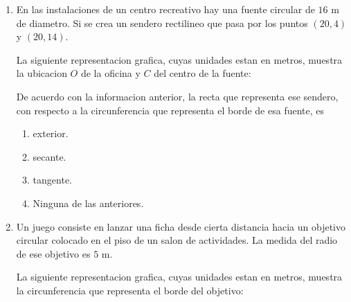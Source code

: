 \documentclass[12pt]{article}
\newcommand{\puntografico}{0.35}
\begin{document}
\begin{enumerate}[label=\textbf{\arabic*.}, itemsep=1.05cm]

\Needspace{0.92\textheight}
\item
En las instalaciones de un centro recreativo hay una fuente circular de $16$ m de diametro. Si se crea un sendero rectilineo que pasa por los puntos $(20,4)$ y $(20,14)$.

La siguiente representacion grafica, cuyas unidades estan en metros, muestra la ubicacion $O$ de la oficina y $C$ del centro de la fuente:

\begin{center}
\end{center}

De acuerdo con la informacion anterior, la recta que representa ese sendero, con respecto a la circunferencia que representa el borde de esa fuente, es

\begin{enumerate}[label=\Alph*)]
  \item exterior.
  \item secante.
  \item tangente.
  \item Ninguna de las anteriores.
\end{enumerate}

\Needspace{0.96\textheight}
\item
Un juego consiste en lanzar una ficha desde cierta distancia hacia un objetivo circular colocado en el piso de un salon de actividades. La medida del radio de ese objetivo es $5$ m.

La siguiente representacion grafica, cuyas unidades estan en metros, muestra la circunferencia que representa el borde del objetivo:

\begin{center}
\end{center}


\end{enumerate}
\end{document}
